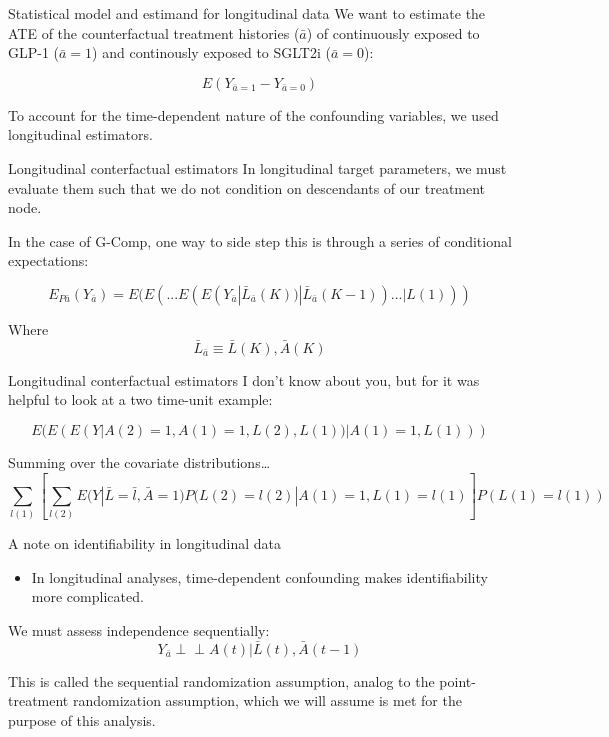 \documentclass[
  ignorenonframetext,
  twocolumn]{beamer}
\providecommand{\tightlist}{%
  \setlength{\itemsep}{0pt}\setlength{\parskip}{0pt}}
\renewcommand{\tightlist}{\setlength{\itemsep}{2ex}\setlength{\parskip}{0pt}}
\begin{document}
\begin{frame}{Statistical model and estimand for longitudinal data}
\protect\hypertarget{statistical-model-and-estimand-for-longitudinal-data}{}
We want to estimate the ATE of the counterfactual treatment histories
(\(\bar{a}\)) of continuously exposed to GLP-1 (\(\bar{a}=1\)) and
continously exposed to SGLT2i (\(\bar{a}=0\)):

\[ E(Y_{\bar{a}=1}-Y_{\bar{a}=0}) \]

To account for the time-dependent nature of the confounding variables,
we used longitudinal estimators.
\end{frame}

\begin{frame}{Longitudinal conterfactual estimators}
\protect\hypertarget{longitudinal-conterfactual-estimators}{}
In longitudinal target parameters, we must evaluate them such that we do
not condition on descendants of our treatment node.

In the case of G-Comp, one way to side step this is through a series of
conditional expectations:

\[E_{P\bar{a}}(Y_{\bar{a}}) = E(E(...E(E(Y_{\bar{a}}|\bar{L}_{\bar{a}}(K))|\bar{L}_{\bar{a}}(K-1))...|L(1)))\]

Where \[\bar{L}_{\bar{a}} \equiv \bar{L}(K),\bar{A}(K)\]
\end{frame}

\begin{frame}{Longitudinal conterfactual estimators}
\protect\hypertarget{longitudinal-conterfactual-estimators-1}{}
I don't know about you, but for it was helpful to look at a two
time-unit example:

\[E( E( E(Y|A(2)=1,A(1)=1,L(2),L(1))|A(1)=1,L(1)))\]

Summing over the covariate distributions\ldots{} \small
\[\sum_{l(1)}  \left[ \sum_{l(2)}E(Y|\bar{L}=\bar{l},\bar{A}=1)P(L(2)=l(2)|A(1)=1,L(1)=l(1)\right]P(L(1)=l(1))\]
\normalsize
\end{frame}

\begin{frame}{A note on identifiability in longitudinal data}
\protect\hypertarget{a-note-on-identifiability-in-longitudinal-data}{}
\begin{itemize}
\tightlist
\item
  In longitudinal analyses, time-dependent confounding makes
  identifiability more complicated.
\end{itemize}

We must assess independence sequentially: \[
Y_{\bar{a}} \perp \!\!\! \perp A(t) | \bar{L}(t), \bar{A}(t-1)
\]

This is called the sequential randomization assumption, analog to the
point-treatment randomization assumption, which we will assume is met
for the purpose of this analysis.
\end{frame}
\end{document}
